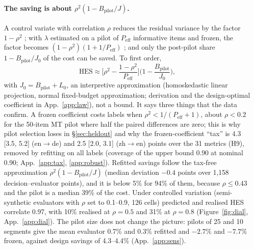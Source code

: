 \documentclass[11pt]{article}
\newcommand{\HES}{\mathrm{HES}}
\newcommand{\Bp}{B_{\mathrm{pilot}}}
\begin{document}
\paragraph{The saving is about $\rho^2(1-\Bp/J)$.} A control variate with correlation $\rho$ reduces the residual variance
by the factor $1-\rho^2$ \citep{angelopoulos2023ppipp}; with $\lambda$ estimated on a pilot of $P_{\mathrm{eff}}$
informative items and frozen, the factor becomes $(1-\rho^2)(1+1/P_{\mathrm{eff}})$ \citep{cochran1977}; and only the
post-pilot share $1-\Bp/J_0$ of the cost can be saved. To first order,
\begin{equation}
\HES\approx\Big[\rho^2-\frac{1-\rho^2}{P_{\mathrm{eff}}}\Big]\Big(1-\frac{\Bp}{J_0}\Big),\label{eq:law}
\end{equation}
with $J_0=\Bp+L_0$, an interpretive approximation (homoskedastic linear projection, normal fixed-budget approximation; derivation and the
design-optimal coefficient in App.~\ref{app:law}), not a bound. It says three things that the data confirm. A frozen
coefficient costs labels when $\rho^2<1/(P_{\mathrm{eff}}+1)$, about $\rho<0.2$ for the 50-item MT pilot where half the
paired differences are zero; this is why pilot selection loses in \S\ref{sec:heldout} and why the frozen-coefficient
``tax'' is 4.3 [3.5, 5.2] (en$\to$de) and 2.5 [2.0, 3.1] (zh$\to$en) points over the 31 metrics (H9), removed by
refitting on all labels (coverage of the upper bound 0.90 at nominal 0.90; App.~\ref{app:tax}, \ref{app:robust}). Refitted savings follow
the tax-free approximation $\rho^2(1-\Bp/J)$ (median deviation $-0.4$ points over 1{,}158 decision--evaluator points),
and it is below 5\% for 94\% of them, because $\rho\le0.43$ and the pilot is a median 39\% of the cost. Under controlled variation
(semi-synthetic evaluators with $\rho$ set to 0.1--0.9, 126 cells) predicted and realised HES correlate 0.97, with 10\%
realised at $\rho=0.5$ and 31\% at $\rho=0.8$ (Figure~\ref{fig:dial}, App.~\ref{app:dial}). The pilot size does not change the picture:
pilots of 25 and 10 segments give the mean evaluator 0.7\% and 0.3\% refitted and $-2.7\%$ and $-7.7\%$ frozen,
against design savings of 4.3--4.4\% (App.~\ref{app:sens}).
\end{document}
